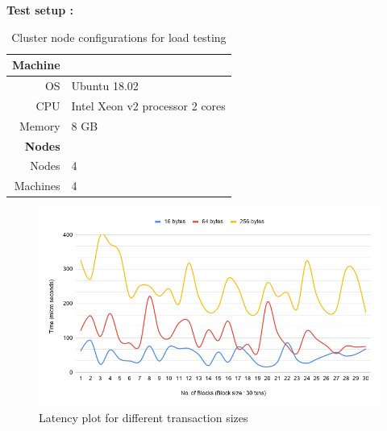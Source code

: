  \textbf{Test setup :}\\
   \begin{table}[!h]
   \centering
\begin{tabular}{ |r|  l| }
\hline
 \textbf{Machine} & \\
 \hline
  OS & Ubuntu 18.02 \\  
   CPU &Intel Xeon v2 processor 2 cores \\
  Memory &8 GB\\
  \hline
  \textbf{Nodes}&\\
  \hline
Nodes  &4\\
Machines & 4\\
\hline

\end{tabular}
\caption{Cluster node configurations for load testing}

\end{table}
\begin{figure}[!h]
    \centering
    \includegraphics[scale=0.5]{images/4_nodes.png}
    \caption{Latency plot for different transaction sizes }
    \label{fig:4_nodes}
\end{figure}


